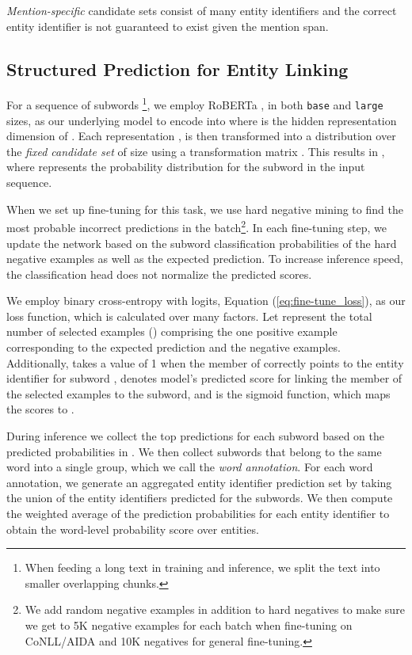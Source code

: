 \documentclass[11pt]{article}
\begin{document}
\textit{Mention-specific} candidate sets consist of many entity identifiers and the correct entity identifier is not guaranteed to exist given the mention span. 

\subsection{Structured Prediction for Entity Linking}\label{sec:sp_for_el}
For a sequence of subwords \footnote{When feeding a long text in training and inference, we split the text into smaller overlapping chunks.}, we employ RoBERTa \citep{RoBERTa}, in both \texttt{base} and \texttt{large} sizes, as our underlying model  to encode  into  where  is the hidden representation dimension of . Each representation ,  is then transformed into a distribution over the \textit{fixed candidate set} of size  using a transformation matrix . This results in , where  represents the probability distribution for the  subword in the input sequence.

When we set up fine-tuning for this task, we use hard negative mining \citep{K19-1049} to find the most probable incorrect predictions in the batch\footnote{We add random negative examples in addition to hard negatives to make sure we get to 5K negative examples for each batch when fine-tuning on CoNLL/AIDA and 10K negatives for general fine-tuning.}. In each fine-tuning step, we update the network based on the subword classification probabilities of the hard negative examples as well as the expected prediction. To increase inference speed, the classification head does not normalize the predicted scores. 

We employ binary cross-entropy with logits, Equation (\ref{eq:fine-tune_loss}), as our loss function, which is calculated over many factors. Let  represent the total number of selected examples () comprising the one positive example corresponding to the expected prediction and the negative examples. Additionally,  takes a value of 1 when the  member of  correctly points to the entity identifier for subword ,  denotes model's predicted score for linking the  member of the selected examples to the  subword, and  is the sigmoid function, which maps the scores to .



During inference we collect the top  predictions for each subword  based on the predicted probabilities in . We then collect subwords that belong to the same word into a single group, which we call the \textit{word annotation}. For each word annotation, we generate an aggregated entity identifier prediction set by taking the union of the entity identifiers predicted for the subwords. We then compute the weighted average of the prediction probabilities for each entity identifier to obtain the word-level probability score over entities.
\end{document}
